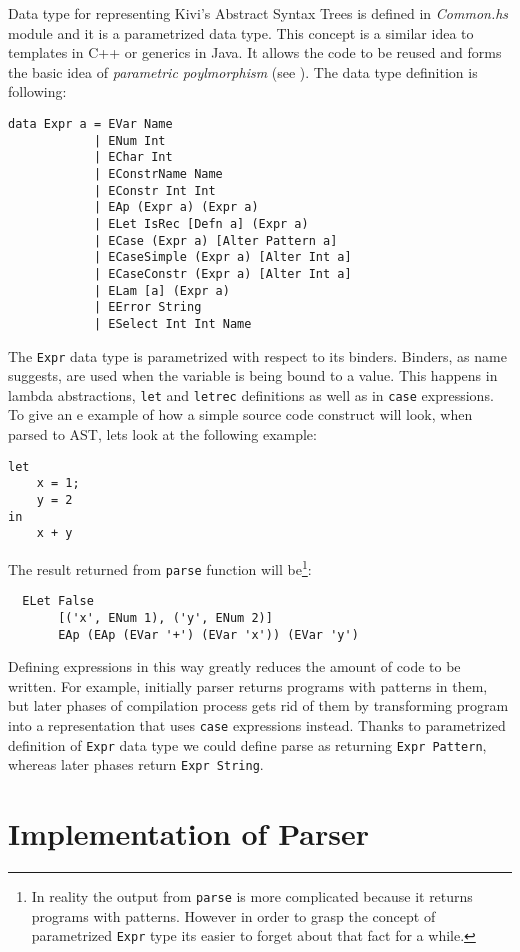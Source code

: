 \documentclass[a4paper]{report}
\begin{document}
Data type for representing Kivi's Abstract Syntax Trees is defined in
\textit{Common.hs} module and it is a parametrized data type. This concept is
a similar idea to templates in C++ or generics in Java. It allows the code to
be reused and forms the basic idea of \textit{parametric poylmorphism}
(see \cite{website:parametric_polymorphism}). The data type definition is
following:
\begin{lstlisting}
data Expr a = EVar Name
            | ENum Int
            | EChar Int
            | EConstrName Name
            | EConstr Int Int
            | EAp (Expr a) (Expr a)
            | ELet IsRec [Defn a] (Expr a)
            | ECase (Expr a) [Alter Pattern a]
            | ECaseSimple (Expr a) [Alter Int a]
            | ECaseConstr (Expr a) [Alter Int a]
            | ELam [a] (Expr a)
            | EError String
            | ESelect Int Int Name
\end{lstlisting}
The \texttt{Expr} data type is parametrized with respect to its binders.
Binders, as name suggests, are used when the variable is being bound to a
value. This happens in lambda abstractions, \texttt{let} and \texttt{letrec}
definitions as well as in \texttt{case} expressions. To give an e example of
how a simple source code construct will look, when parsed to AST,  lets look at
the following example:
\begin{lstlisting}
let
    x = 1;
    y = 2
in
    x + y
\end{lstlisting}
The result returned from \texttt{parse} function will be\footnote{In reality
the output from \texttt{parse} is more complicated because it returns programs
with patterns. However in order to grasp the concept of parametrized
\texttt{Expr} type its easier to forget about that fact for a while.}:
\begin{lstlisting}
  ELet False
       [('x', ENum 1), ('y', ENum 2)]
       EAp (EAp (EVar '+') (EVar 'x')) (EVar 'y')
\end{lstlisting}

Defining expressions in this way greatly reduces the amount of code to be
written. For example, initially parser returns programs with patterns in them,
but later phases of compilation process gets rid of them by transforming
program into a representation that uses \texttt{case} expressions instead.
Thanks to parametrized definition of \texttt{Expr} data type we could define
parse as returning \texttt{Expr Pattern}, whereas later phases return
\texttt{Expr String}.

\section{Implementation of Parser}
\end{document}
